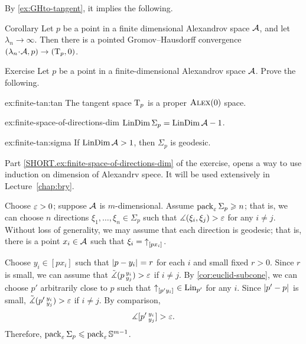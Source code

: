 By \ref{ex:GHto-tangent}, it implies the following.

\begin{thm}{Corollary}\label{ex:GHto-tangent-finite-dim}
Let $p$ be a point in a finite dimensional Alexandrov space $\mathcal{A}$,
and let $\lambda_n\to\infty$.
Then there is a pointed Gromov--Hausdorff convergence $(\lambda_n\cdot \spc{A},p)\z\to (\T_p,0)$.
\end{thm}


\begin{thm}{Exercise}\label{ex:finite-tan}
Let $p$ be a point in a finite-dimensional Alexandrov space $\mathcal{A}$.
Prove the following.
\begin{subthm}{ex:finite-tan:tan}
The tangent space $\mathrm{T}_p$ is a proper $\textsc{Alex}(0)$ space.
\end{subthm}

\begin{subthm}{ex:finite-space-of-directions-dim}
$\mathop{\rm LinDim}\nolimits\Sigma_p=\mathop{\rm LinDim}\nolimits\mathcal{A}-1$.
\end{subthm}

\begin{subthm}{ex:finite-tan:sigma}
If $\mathop{\rm LinDim}\nolimits \mathcal{A}>1$, then $\Sigma_p$ is geodesic.
\end{subthm}

\end{thm}

Part \ref{SHORT.ex:finite-space-of-directions-dim} of the exercise, opens a way to use induction on dimension of Alexandrv spece.
It will be used extensively in Lecture~\ref{chap:bry}.

Choose $\varepsilon>0$; suppose $\mathcal{A}$ is $m$-dimensional.
Assume $\operatorname{\rm pack}\nolimits_\varepsilon \Sigma_p\geqslant n$;
that is, we can choose $n$ directions $\xi_1,\dots, \xi_n\in \Sigma_p$ such that $\measuredangle(\xi_i,\xi_j)>\varepsilon$ for any $i\ne j$.
Without loss of generality, we may assume that each direction is geodesic;
that is, there is a point $x_i\in \mathcal{A}$ such that $\xi_i={\uparrow}_{[{p}{x_i}]_{{}}}$.

Choose $y_i\in [px_i]$ such that $|{p}-{y_i}|_{}^{{}}=r$ for each $i$ and small fixed $r>0$.
Since $r$ is small, we can assume that $\tilde\measuredangle(p\,{}^{y_i}_{y_j})>\varepsilon$ if $i\ne j$.
By \ref{cor:euclid-subcone}, we can choose $p'$ arbitrarily close to $p$ such that ${\uparrow}_{[{p'}{y_i}]_{{}}}\in \mathop{\rm Lin}\nolimits_{p'}$ for any $i$.
Since  $|{p'}-{p}|_{}^{{}}$ is small, $\tilde\measuredangle(p'\,{}^{y_i}_{y_j})>\varepsilon$ if $i\ne j$.
By comparison, 
\[\measuredangle [p'\,{}^{y_i}_{y_j}]>\varepsilon.\]
Therefore, $\operatorname{\rm pack}\nolimits_\varepsilon \Sigma_p\leqslant \operatorname{\rm pack}\nolimits_\varepsilon\mathbb{S}^{m-1}$.

